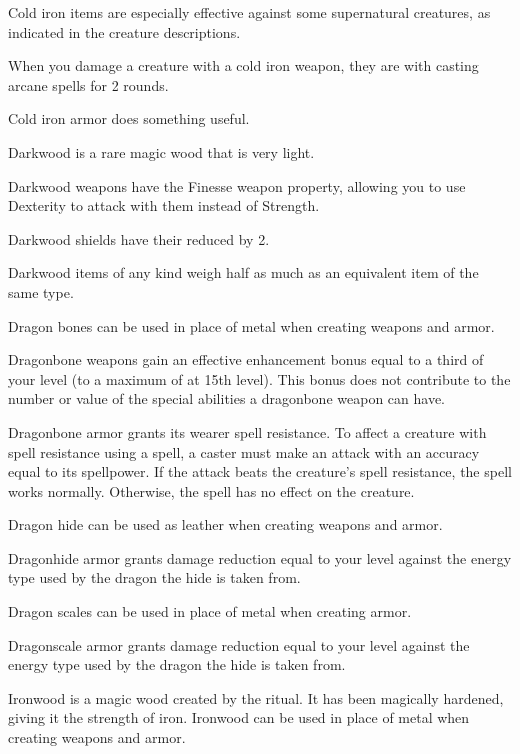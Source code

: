         Cold iron items are especially effective against some supernatural creatures, as indicated in the creature descriptions.

        When you damage a creature with a cold iron weapon, they are \impaired with casting arcane spells for 2 rounds.

        Cold iron armor does something useful.

        Darkwood is a rare magic wood that is very light.

        Darkwood weapons have the Finesse weapon property, allowing you to use Dexterity to attack with them instead of Strength.

        Darkwood shields have their  reduced by 2.

        Darkwood items of any kind weigh half as much as an equivalent item of the same type.


        Dragon bones can be used in place of metal when creating weapons and armor.

        Dragonbone weapons gain an effective enhancement bonus equal to a third of your level (to a maximum of  at 15th level).
        This bonus does not contribute to the number or value of the special abilities a dragonbone weapon can have.

        Dragonbone armor grants its wearer spell resistance.
        To affect a creature with spell resistance using a spell, a caster must make an attack with an accuracy equal to its spellpower.
        If the attack beats the creature's spell resistance, the spell works normally.
        Otherwise, the spell has no effect on the creature.


        Dragon hide can be used as leather when creating weapons and armor.

        Dragonhide armor grants damage reduction equal to your level against the energy type used by the dragon the hide is taken from.


        Dragon scales can be used in place of metal when creating armor.

        Dragonscale armor grants damage reduction equal to your level against the energy type used by the dragon the hide is taken from.

        Ironwood is a magic wood created by the  ritual.
        It has been magically hardened, giving it the strength of iron.
        Ironwood can be used in place of metal when creating weapons and armor.

